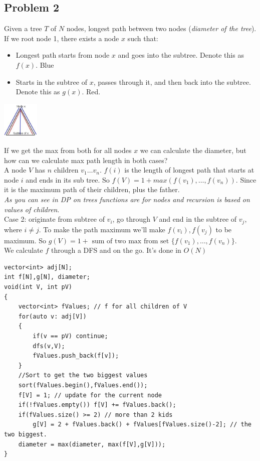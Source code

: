 \documentclass{IEEEtran}
\begin{document}
        \subsection{Problem 2}
            Given a tree $T$ of $N$ nodes, longest path between two nodes (\textit{diameter of the tree}). If we root node 1, there exists a node $x$ such that:
            \begin{itemize}
                \item Longest path starts from node $x$ and goes into the subtree. Denote this as $f(x)$. Blue
                \item Starts in the subtree of $x$, passes through it, and then back into the subtree. Denote this as $g(x)$. Red. 
            \end{itemize}
            \begin{center}
                \includegraphics[width=0.13\textwidth]{dpTreeNodeX.png}
            \end{center}
            If we get the max from both for all nodes $x$ we can calculate the diameter, but how can we calculate max path length in both cases?\\
            A node $V$ has $n$ children $v_1\ldots v_n$. $f(i)$ is the length of longest path that starts at node $i$ and ends in its sub tree. So $f(V) = 1 + max(f(v_1),\ldots,f(v_n))$. Since it is the maximum path of their children, plus the father.\\
            \textit{As you can see in DP on trees functions are for nodes and recursion is based on values of children}.\\
            Case 2: originate from subtree of $v_i$, go through $V$ and end in the subtree of $v_j$, where $i\neq j$. To make the path maximum we'll make $f(v_i), f(v_j)$ to be maximum. So $g(V) = 1 + \text{ sum of two max from set } \{f(v_1),\ldots,f(v_n)\}$.\\
            We calculate $f$ through a DFS and on the go. It's done in $O(N)$
            \begin{lstlisting}
vector<int> adj[N];
int f[N],g[N], diameter;
void(int V, int pV)
{
    vector<int> fValues; // f for all children of V
    for(auto v: adj[V])
    {
        if(v == pV) continue;
        dfs(v,V);
        fValues.push_back(f[v]);
    }
    //Sort to get the two biggest values
    sort(fValues.begin(),fValues.end());
    f[V] = 1; // update for the current node
    if(!fValues.empty()) f[V] += fValues.back();
    if(fValues.size() >= 2) // more than 2 kids
        g[V] = 2 + fValues.back() + fValues[fValues.size()-2]; // the two biggest.
    diameter = max(diameter, max(f[V],g[V]));
}
            \end{lstlisting}
\end{document}
